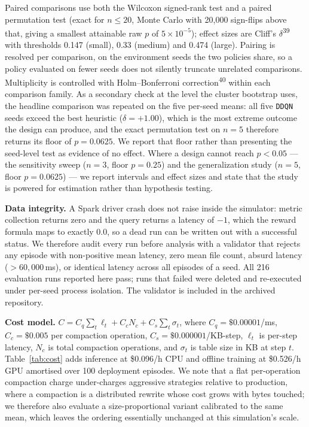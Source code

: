 \documentclass[fleqn,10pt]{wlscirep}
\newcommand{\ddqn}{\texttt{DDQN}}
\begin{document}
Paired comparisons use both the Wilcoxon signed-rank test and a paired
permutation test (exact for $n \leq 20$, Monte Carlo with 20{,}000
sign-flips above that, giving a smallest attainable raw $p$ of
$5\times10^{-5}$); effect sizes are Cliff's
$\delta$\textsuperscript{39} with thresholds 0.147 (small), 0.33
(medium) and 0.474 (large). Pairing is resolved per comparison, on the
environment seeds the two policies share, so a policy evaluated on fewer
seeds does not silently truncate unrelated comparisons. Multiplicity is
controlled with Holm--Bonferroni correction\textsuperscript{40} within
each comparison family. As a secondary check at the level the cluster
bootstrap uses, the headline comparison was repeated on the five
per-seed means: all five \ddqn{} seeds exceed the best heuristic
($\delta = +1.00$), which is the most extreme outcome the design can
produce, and the exact permutation test on $n=5$ therefore returns its
floor of $p = 0.0625$. We report that floor rather than presenting the
seed-level test as evidence of no effect. Where a design cannot reach $p < 0.05$ --- the sensitivity sweep
($n=3$, floor $p = 0.25$) and the generalization study ($n=5$, floor
$p = 0.0625$) --- we report intervals and effect sizes and state that the
study is powered for estimation rather than hypothesis testing.

\textbf{Data integrity.}
A Spark driver crash does not raise inside the simulator: metric
collection returns zero and the query returns a latency of $-1$, which
the reward formula maps to exactly 0.0, so a dead run can be written out
with a successful status. We therefore audit every run before analysis
with a validator that rejects any episode with non-positive mean
latency, zero mean file count, absurd latency ($>60{,}000$\,ms), or
identical latency across all episodes of a seed. All 216 evaluation runs
reported here pass; runs that failed were deleted and re-executed under
per-seed process isolation. The validator is included in the archived
repository.

\textbf{Cost model.}
$C = C_q \sum_t \ell_t + C_c N_c + C_s \sum_t \sigma_t$, where
$C_q = \$0.00001$/ms, $C_c = \$0.005$ per compaction operation,
$C_s = \$0.000001$/KB-step, $\ell_t$ is per-step latency, $N_c$ is total
compaction operations, and $\sigma_t$ is table size in KB at step $t$.
Table~\ref{tab:cost} adds inference at \$0.096/h CPU and offline
training at \$0.526/h GPU amortised over 100 deployment episodes. We
note that a flat per-operation compaction charge under-charges
aggressive strategies relative to production, where a compaction is a
distributed rewrite whose cost grows with bytes touched; we therefore
also evaluate a size-proportional variant calibrated to the same mean,
which leaves the ordering essentially unchanged at this simulation's
scale.
\end{document}
